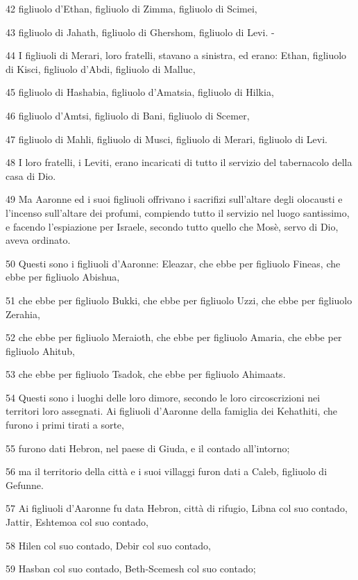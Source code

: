 \par 42 figliuolo d'Ethan, figliuolo di Zimma, figliuolo di Scimei,
\par 43 figliuolo di Jahath, figliuolo di Ghershom, figliuolo di Levi. -
\par 44 I figliuoli di Merari, loro fratelli, stavano a sinistra, ed erano: Ethan, figliuolo di Kisci, figliuolo d'Abdi, figliuolo di Malluc,
\par 45 figliuolo di Hashabia, figliuolo d'Amatsia, figliuolo di Hilkia,
\par 46 figliuolo d'Amtsi, figliuolo di Bani, figliuolo di Scemer,
\par 47 figliuolo di Mahli, figliuolo di Musci, figliuolo di Merari, figliuolo di Levi.
\par 48 I loro fratelli, i Leviti, erano incaricati di tutto il servizio del tabernacolo della casa di Dio.
\par 49 Ma Aaronne ed i suoi figliuoli offrivano i sacrifizi sull'altare degli olocausti e l'incenso sull'altare dei profumi, compiendo tutto il servizio nel luogo santissimo, e facendo l'espiazione per Israele, secondo tutto quello che Mosè, servo di Dio, aveva ordinato.
\par 50 Questi sono i figliuoli d'Aaronne: Eleazar, che ebbe per figliuolo Fineas, che ebbe per figliuolo Abishua,
\par 51 che ebbe per figliuolo Bukki, che ebbe per figliuolo Uzzi, che ebbe per figliuolo Zerahia,
\par 52 che ebbe per figliuolo Meraioth, che ebbe per figliuolo Amaria, che ebbe per figliuolo Ahitub,
\par 53 che ebbe per figliuolo Tsadok, che ebbe per figliuolo Ahimaats.
\par 54 Questi sono i luoghi delle loro dimore, secondo le loro circoscrizioni nei territori loro assegnati. Ai figliuoli d'Aaronne della famiglia dei Kehathiti, che furono i primi tirati a sorte,
\par 55 furono dati Hebron, nel paese di Giuda, e il contado all'intorno;
\par 56 ma il territorio della città e i suoi villaggi furon dati a Caleb, figliuolo di Gefunne.
\par 57 Ai figliuoli d'Aaronne fu data Hebron, città di rifugio, Libna col suo contado, Jattir, Eshtemoa col suo contado,
\par 58 Hilen col suo contado, Debir col suo contado,
\par 59 Hasban col suo contado, Beth-Scemesh col suo contado;
